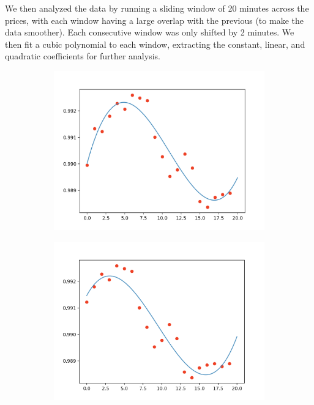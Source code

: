 \documentclass[final]{article}
\begin{document}
We then analyzed the data by running a sliding window of 20 minutes
across the prices, with each window having a large overlap with the
previous (to make the data smoother). Each consecutive window was only
shifted by 2 minutes. We then fit a cubic polynomial to each window,
extracting the constant, linear, and quadratic coefficients for
further analysis.

\begin{figure}[H]
  \centering
  \begin{subfigure}{.3\textwidth}
    \centering
    \includegraphics[width=\linewidth]{img/sliding1}
  \end{subfigure}
  \begin{subfigure}{.3\textwidth}
    \centering
    \includegraphics[width=\linewidth]{img/sliding2}

\end{subfigure}
\end{figure}
\end{document}

